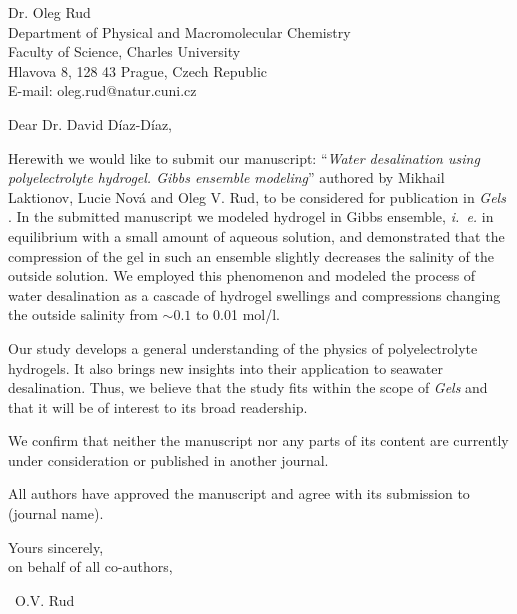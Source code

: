 \documentclass[12pt]{dinbrief}
\date{\today}
\newcommand{\theeditor}{Dr. David Díaz-Díaz}
\newcommand{\thejournal}{\textit{Gels }}
\newcommand{\ie}{\textit{i.~e.} }
\begin{document}
\begin{letter}{
Dr. Oleg Rud\\
Department of Physical and Macromolecular Chemistry\\
Faculty of Science, Charles University\\
Hlavova 8, 128 43 Prague, Czech Republic\\
E-mail: oleg.rud@natur.cuni.cz\\
}
\vspace*{-1.5cm}

\opening{Dear \theeditor,}

Herewith we would like to submit our manuscript: ``\textit{Water desalination using polyelectrolyte hydrogel. Gibbs ensemble modeling}''
authored by
Mikhail Laktionov, Lucie Nová and Oleg V. Rud,
 to be considered for publication in \thejournal. 
In the submitted manuscript we modeled hydrogel in Gibbs ensemble, \ie in equilibrium with a small amount of aqueous solution, and demonstrated that the compression of the gel in such an ensemble slightly decreases the salinity of the outside solution. 
We employed this phenomenon and modeled the process of water desalination as a cascade of hydrogel swellings and compressions changing the outside salinity from $\sim 0.1$ to 0.01 mol/l.

Our study develops a general understanding of the physics of polyelectrolyte hydrogels. It also brings new insights into their application to seawater desalination. Thus, we believe that the study fits within the scope of \thejournal and that it will be of interest to its broad readership.

\vspace{5ex}

We confirm that neither the manuscript nor any parts of its content are currently under consideration or published in another journal.

All authors have approved the manuscript and agree with its submission to (journal name).



Yours sincerely,\\
on behalf of all co-authors,

\hspace{80ex}\ O.V. Rud\\







\end{letter}
\end{document}
